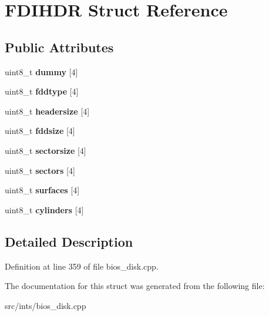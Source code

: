 \hypertarget{structFDIHDR}{\section{F\-D\-I\-H\-D\-R Struct Reference}
\label{structFDIHDR}
}
\subsection*{Public Attributes}
\begin{DoxyCompactItemize}
\item 
\hypertarget{structFDIHDR_a1c884cddb02c6661d8fc9f192b3fc22f}{uint8\-\_\-t {\bfseries dummy} \mbox{[}4\mbox{]}}\label{structFDIHDR_a1c884cddb02c6661d8fc9f192b3fc22f}

\item 
\hypertarget{structFDIHDR_a47545c8404b2ae2f8377e1bcc02fc8f0}{uint8\-\_\-t {\bfseries fddtype} \mbox{[}4\mbox{]}}\label{structFDIHDR_a47545c8404b2ae2f8377e1bcc02fc8f0}

\item 
\hypertarget{structFDIHDR_a09132fda6189c6cec4e4aa2d05868174}{uint8\-\_\-t {\bfseries headersize} \mbox{[}4\mbox{]}}\label{structFDIHDR_a09132fda6189c6cec4e4aa2d05868174}

\item 
\hypertarget{structFDIHDR_a0bc19446daf786a86e01fdfd0f396438}{uint8\-\_\-t {\bfseries fddsize} \mbox{[}4\mbox{]}}\label{structFDIHDR_a0bc19446daf786a86e01fdfd0f396438}

\item 
\hypertarget{structFDIHDR_ac0d70ea816470f23818e513aec16187a}{uint8\-\_\-t {\bfseries sectorsize} \mbox{[}4\mbox{]}}\label{structFDIHDR_ac0d70ea816470f23818e513aec16187a}

\item 
\hypertarget{structFDIHDR_a8df34ba3a180f2c436938eef65b1dd83}{uint8\-\_\-t {\bfseries sectors} \mbox{[}4\mbox{]}}\label{structFDIHDR_a8df34ba3a180f2c436938eef65b1dd83}

\item 
\hypertarget{structFDIHDR_a0075a0f7719ce25a93642b9db90d5000}{uint8\-\_\-t {\bfseries surfaces} \mbox{[}4\mbox{]}}\label{structFDIHDR_a0075a0f7719ce25a93642b9db90d5000}

\item 
\hypertarget{structFDIHDR_aed3de62f3b389214c84acec24434a0ee}{uint8\-\_\-t {\bfseries cylinders} \mbox{[}4\mbox{]}}\label{structFDIHDR_aed3de62f3b389214c84acec24434a0ee}

\end{DoxyCompactItemize}


\subsection{Detailed Description}


Definition at line 359 of file bios\-\_\-disk.\-cpp.



The documentation for this struct was generated from the following file\-:\begin{DoxyCompactItemize}
\item 
src/ints/bios\-\_\-disk.\-cpp\end{DoxyCompactItemize}
